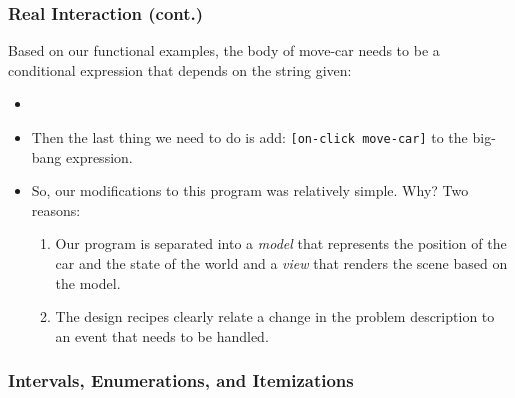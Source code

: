 \documentclass{beamer}
\begin{document}

\begin{frame}
  \frametitle{Real Interaction (cont.)}
  Based on our functional examples, the body of move-car needs to be a
  conditional expression that depends on the string given:
  \begin{itemize}
  \item<2-> \moveCar
  \item<3-> Then the last thing we need to do is add:
    \texttt{[on-click move-car]} to the big-bang expression.
  \item<4-> So, our modifications to this program was relatively simple. Why?
    Two reasons:
    \begin{enumerate}
    \item<5-> Our program is separated into a \emph{model} that represents
      the position of the car and the state of the world and a \emph{view}
      that renders the scene based on the model.
    \item<6-> The design recipes clearly relate a change in the problem description
      to an event that needs to be handled.
    \end{enumerate}
  \end{itemize}
\end{frame}

\begin{frame}
  \frametitle{Intervals, Enumerations, and Itemizations}
  
\end{frame}
\end{document}
